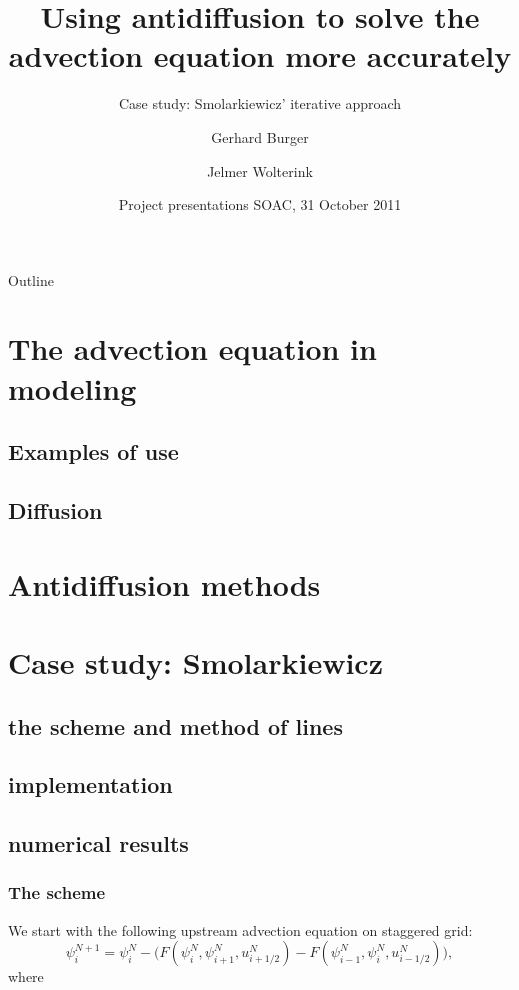 \documentclass[hyperref={pdfstartview=Fit}]{beamer}
\title[Advection equation and antidiffusion]
{Using antidiffusion to solve the advection equation more accurately}
\subtitle{Case study: Smolarkiewicz' iterative approach}
\author[Burger, Wolterink]
{Gerhard Burger \and Jelmer Wolterink}
\institute[Utrecht University]
{
  Scientific Computing\\
  Department of Mathematics\\
  Utrecht University
}
\date[31-Oct-2011] %
{Project presentations SOAC, 31 October 2011}
\begin{document}
\begin{frame}
  \titlepage
\end{frame}

\begin{frame}{Outline}
  \tableofcontents
\end{frame}

\section{The advection equation in modeling}
\subsection{Examples of use}
\subsection{Diffusion}

\section{Antidiffusion methods}

\section{Case study: Smolarkiewicz}
\subsection{the scheme and method of lines}
\subsection{implementation}
\subsection{numerical results}

\begin{frame}
\frametitle{The scheme}
We start with the following upstream advection equation on staggered grid:
\begin{equation*}
 \psi_i^{N+1} = \psi_i^N - \Big( F \left( \psi_i^N,\psi_{i+1}^N,u_{i+1/2}^N\right)
-F \left( \psi_{i-1}^N,\psi_{i}^N,u_{i-1/2}^N\right) \Big),
\end{equation*}
where
\end{frame}
\end{document}
